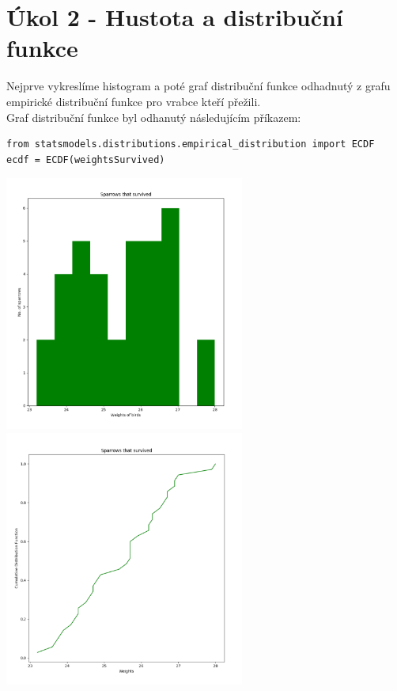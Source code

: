\documentclass[12pt,a4paper]{article}
\begin{document}
\section{Úkol 2 - Hustota a distribuční funkce}
Nejprve vykreslíme histogram a poté graf distribuční funkce odhadnutý z grafu empirické distribuční funkce pro vrabce kteří přežili.\\
Graf distribuční funkce byl odhanutý následujícím příkazem:\par \medskip
\begin{lstlisting}
from statsmodels.distributions.empirical_distribution import ECDF
ecdf = ECDF(weightsSurvived)
\end{lstlisting}
\smallskip
\noindent \includegraphics[width=3.1in]{survivedHist}
\includegraphics[width=3.1in]{survivedDist}
\pagebreak
\end{document}
